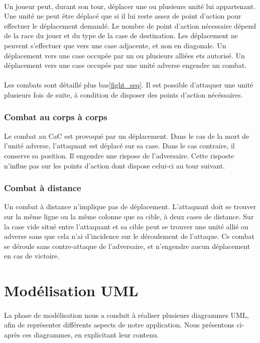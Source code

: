 \documentclass[a4paper]{article}
\begin{document}
\paragraph{}
Un joueur peut, durant son tour, déplacer une ou plusieurs unité lui appartenant. Une unité ne peut être déplacé que si il lui reste assez de point d'action pour effectuer le déplacement demandé. Le nombre de point d'action nécessaire dépend de la race du jouer et du type de la case de destination. Les déplacement ne peuvent s'effectuer que vers une case adjacente, et non en diagonale. Un déplacement vers une case occupée par un ou plusieurs alliées ets autorisé. Un déplacement vers une case occupée par une unité adverse engendre un combat.

\paragraph{}
Les combats sont détaillé plus bas\ref{fight_seq}. Il est possible d'attaquer une unité plusieurs fois de suite, à condition de disposer des points d'action nécéssaires.
\subsubsection{Combat au corps à corps}
Le combat au CaC est provoqué par un déplacement. Dans le cas de la mort de l'unité adverse, l'attaquant est déplacé sur sa case. Dans le cas contraire, il conserve sa position.
Il engendre une rispose de l'adversaire. Cette risposte n'influe pas sur les points d'action dont dispose celui-ci au tour suivant.
\subsubsection{Combat à distance}
Un combat à distance n'implique pas de déplacement. L'attaquant doit se trouver sur la même ligne ou la même colonne que sa cible, à deux cases de distance. Sur la case vide situé entre l'attaquant et sa cible peut se trouver une unité allié ou adverse sans que cela n'ai d'incidence sur le déroulement de l'attaque.
Ce combat se déroule sans contre-attaque de l'adversaire, et n'engendre aucun déplacement en cas de victoire. 
\section{Modélisation UML}
\paragraph{}
La phase de modélisation nous a conduit à réaliser plusieurs diagrammes UML, afin de représenter différents aspects de notre application. Nous présentons ci-après ces diagrammes, en explicitant leur contenu.
\end{document}
